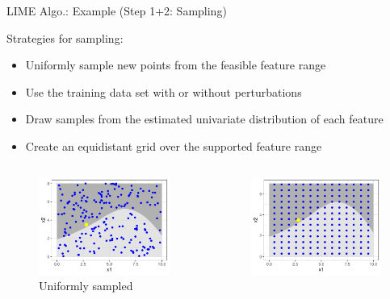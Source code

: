 \documentclass[10pt,compress,t,notes=noshow, xcolor=table]{beamer}
\begin{document}
\begin{frame}{LIME Algo.: Example (Step 1+2: Sampling)}
		
		Strategies for sampling: 
		\begin{itemize} 
			\item Uniformly sample new points from the feasible feature range 
			\item Use the training data set with or without perturbations
			\item Draw samples from the estimated univariate distribution of each feature
			\item Create an equidistant grid over the supported feature range  
		\end{itemize}
		\vspace{-.5cm}
		\begin{columns}[totalwidth=\textwidth]
        \begin{column}{0.5\textwidth}  %
            \begin{figure}
             \includegraphics[width=.95\textwidth]{figure/lime3} 
             \vspace{-0.3cm}
             \caption{Uniformly sampled}
             \end{figure}
        \end{column}
        \begin{column}{0.5\textwidth}  %
		    \begin{figure}
			\includegraphics[width=.95\textwidth]{figure/lime3a}

\end{figure}
\end{column}
\end{columns}
\end{frame}
\end{document}
